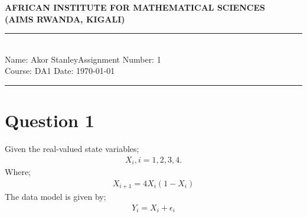 \documentclass[12pt,a4paper]{article}
\newcommand{\student}{Akor Stanley}
\newcommand{\course}{DA1 }
\newcommand{\assignment}{1}
\begin{document}
\thispagestyle{empty}
\begin{center}
\textbf{AFRICAN INSTITUTE FOR MATHEMATICAL SCIENCES \\[0.5cm]
(AIMS RWANDA, KIGALI)}
\vspace{1.0cm}
\end{center}
\noindent
\rule{17cm}{0.2cm}\\[0.3cm]
Name: \student \hfill Assignment Number: \assignment\\[0.1cm]
Course: \course \hfill Date: \today\\
\rule{17cm}{0.05cm}
\vspace{1.0cm}
\section*{Question 1}
Given the real-valued state variables;
\begin{align*}
X_{i}, i=1,2,3,4.
\end{align*}
Where;
\begin{align}
X_{i+1}=4X_{i}(1-X_{i}) \label{1}
\end{align}
The data model is given by;
\begin{align*}
Y_{i}=X_{i}+\epsilon_{i}
\end{align*}
\end{document}
